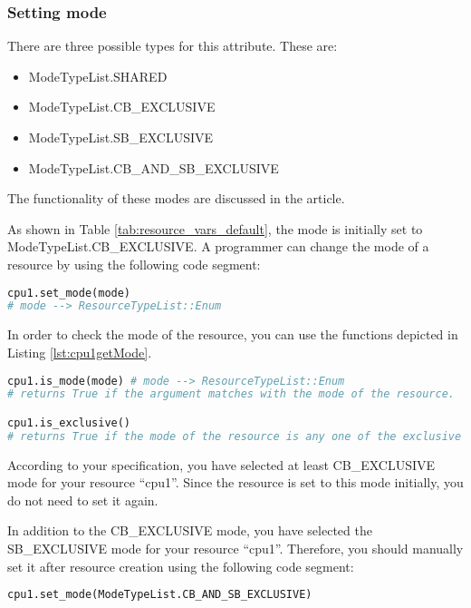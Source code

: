 \documentclass[]{scrartcl}
\begin{document}
\subsubsection{Setting mode}
There are three possible types for this attribute. These are:
\begin{itemize}
    \item \textsf{ModeTypeList.SHARED}
    \item \textsf{ModeTypeList.CB\_EXCLUSIVE}
    \item \textsf{ModeTypeList.SB\_EXCLUSIVE}
    \item \textsf{ModeTypeList.CB\_AND\_SB\_EXCLUSIVE}
\end{itemize}
The functionality of these modes are discussed in the article.

As shown in Table \ref{tab:resource_vars_default}, the mode is initially set to \textsf{ModeTypeList.CB\_EXCLUSIVE}. A programmer can change the mode of a resource by using the following code segment:

\begin{lstlisting}[language=Python, frame=single, label={lst:cpu1setMode}, caption={Setting the mode of a resource after creating a resource.}]
cpu1.set_mode(mode)
# mode --> ResourceTypeList::Enum
\end{lstlisting}
        

In order to check the mode of the resource, you can use the functions depicted in Listing \ref{lst:cpu1getMode}.

\begin{lstlisting}[language=Python, frame=single, label={lst:cpu1getMode}, caption={The functions for resource mode check.}]
cpu1.is_mode(mode) # mode --> ResourceTypeList::Enum
# returns True if the argument matches with the mode of the resource.

cpu1.is_exclusive()
# returns True if the mode of the resource is any one of the exclusive mode.
\end{lstlisting}
        
        
According to your specification, you have selected at least \textsf{CB\_EXCLUSIVE} mode for your resource ``cpu1''. Since the resource is set to this mode initially, you do not need to set it again.
        
In addition to the CB\_EXCLUSIVE mode, you have selected the \textsf{SB\_EXCLUSIVE} mode for your resource ``cpu1''. Therefore, you should manually set it after resource creation using the following code segment:

\begin{lstlisting}[language=Python, frame=single, label={lst:cpu1setCBSBExclusiveResource}, caption={The resource is set to CB\_AND\_SB\_EXCLUSIVE mode.}]
cpu1.set_mode(ModeTypeList.CB_AND_SB_EXCLUSIVE)
\end{lstlisting}
        
\end{document}
